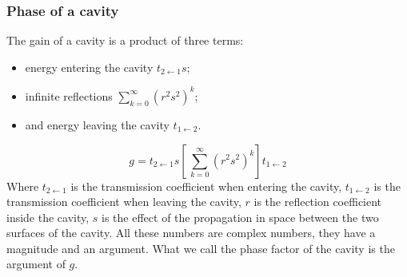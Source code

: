 \subsubsection{Phase of a cavity}
The gain of a cavity is a product of three terms:
\begin{itemize}
    \item energy entering the cavity $t_{2 \leftarrow 1} s$;
    \item infinite reflections $\sum_{k=0}^\infty (r^2s^2)^k$;
    \item and energy leaving the cavity $t_{1 \leftarrow 2}$.
\end{itemize}
\begin{equation}
    g = t_{2 \leftarrow 1} s
    \left[ \, \sum_{k=0}^\infty (r^2s^2)^k \right]
    t_{1 \leftarrow 2}
    \label{eq:gain_cavity}
\end{equation}
Where $t_{2 \leftarrow 1}$ is the transmission coefficient when entering the cavity,
$t_{1 \leftarrow 2}$ is the transmission coefficient when leaving the cavity,
$r$ is the reflection coefficient inside the cavity,
$s$ is the effect of the propagation in space between the two surfaces of the cavity.
All these numbers are complex numbers, they have a magnitude and an argument.
What we call the phase factor of the cavity is the argument of $g$.

